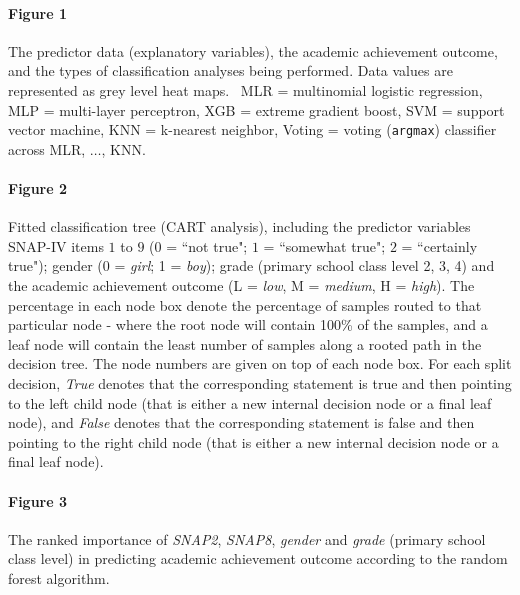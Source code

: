 \documentclass[10pt,letterpaper]{article}
\begin{document}
{\paragraph{Figure 1} The predictor data (explanatory variables), the academic achievement outcome, and the types of classification analyses being performed. 
Data values are represented as grey level heat maps. \,
MLR = multinomial logistic regression, MLP = multi-layer perceptron, XGB = extreme gradient boost, SVM = support vector machine, KNN = k-nearest neighbor, 
Voting = voting ({\tt \small argmax}) classifier across MLR, $\ldots$, KNN. \\



\vspace{3mm}

\paragraph{Figure 2} Fitted classification tree (CART analysis),  including the predictor variables SNAP-IV items $1$ to $9$ ($0$ = ``not true"; $1$ = ``somewhat true";
 $2$ = ``certainly true"); gender (0 = \emph{girl}; 1 = \emph{boy}); grade (primary school class level 2, 3, 4) and the academic achievement outcome (L = \emph{low},  M = \emph{medium}, H = \emph{high}). The percentage in each node box denote the
 percentage of samples routed to that particular node - where the root node will contain 100\% of the samples, and a leaf node will contain the least number of samples along 
 a rooted path in the decision tree.
The node numbers are given on top of each node box. For each split decision, \emph{True} denotes that the corresponding statement is true 
and then pointing to the left child node
(that is either a new internal decision node or a final leaf node), and \emph{False}
denotes that the corresponding statement is false and then pointing to the right child node (that is either a new internal decision node or a final leaf node).  

\vspace{3mm}

\paragraph{Figure 3} The ranked importance of {\it SNAP2}, {\it SNAP8}, {\it gender} and {\it grade} (primary school class level) in predicting academic achievement outcome according to the random forest algorithm. 


}
\end{document}
